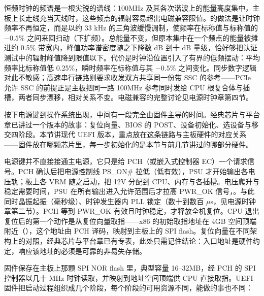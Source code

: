 恒频时钟的频谱是一根尖锐的谱线：100MHz 及其各次谐波上的能量高度集中，主板上长走线充当天线时，这些频点的辐射容易超出电磁兼容限值。的做法是让时钟频率不再恒定，而是以约 33 kHz 的三角波缓慢调制，使频率在标称值与标称值的 $-0.5\%$ 之间来回扫动（下扩频）。总能量不变，但原本集中在一个频点的能量被摊进约 0.5\% 带宽内，峰值功率谱密度随之下降数 dB 到十 dB 量级，恰好够把认证测试中的辐射峰值降到限值以下。代价是时钟沿位置引入了有界的低频摆动：平均频率比标称值低 0.25\%，瞬时频率在标称值与其 $-0.5\%$ 之间变化。同步数字逻辑对此不敏感；高速串行链路则要求收发双方共享同一份带 SSC 的参考——PCIe 允许 SSC 的前提正是主板把同一路 100MHz 参考同时发给 CPU 根复合体与插槽，两者同步漂移，相对关系不变。电磁兼容的完整讨论见电源时钟章第四节。


按下电源键到操作系统出现，中间有一段完全由固件主导的时间。经典芯片与平台章已讲过一个版本的故事：复位向量、BIOS 的 POST、设备初始化、选设备与移交四阶段。本节讲现代 UEFI 版本，重点放在这条链路与主板硬件的对应关系——固件放在哪颗芯片里，每一步初始化的是本节与前几节讲过的哪部分硬件。


电源键并不直接接通主电源，它只是给 PCH（或嵌入式控制器 EC）一个请求信号。PCH 确认后把电源控制线 PS\_ON\# 拉低（低有效），PSU 才开始输出各电压轨；板上各 VRM 随之启动，把 12V 分配到 CPU、内存与各插槽。电压爬升与稳定需要时间，PSU 在所有输出进入允许范围后才拉高 PWR\_OK 信号，。与此同时晶振起振（毫秒级）、时钟发生器内 PLL 锁定（数十到数百 $\mu$s，见电源时钟章第二节）。PCH 等到 PWR\_OK 有效且时钟稳定，才释放全机复位。CPU 退出复位后的第一个动作是从复位向量取指——x86 的初始取指地址在 4GB 空间顶端附近（），这个地址由 PCH 译码，映射到主板上的 SPI flash。复位向量在不同架构上的对照，经典芯片与平台章已有专表，此处只需记住结论：入口地址是硬件约定，响应该地址的必须是可靠的非易失存储。


固件保存在主板上那颗 SPI NOR flash 里，典型容量 16--32MB，经 PCH 的 SPI 控制器以几十 MHz 时钟读取，并映射到地址空间顶端供 CPU 直接取指。UEFI 固件把启动过程组织成几个阶段，每个阶段的可用资源不同，能做的事也不同：

